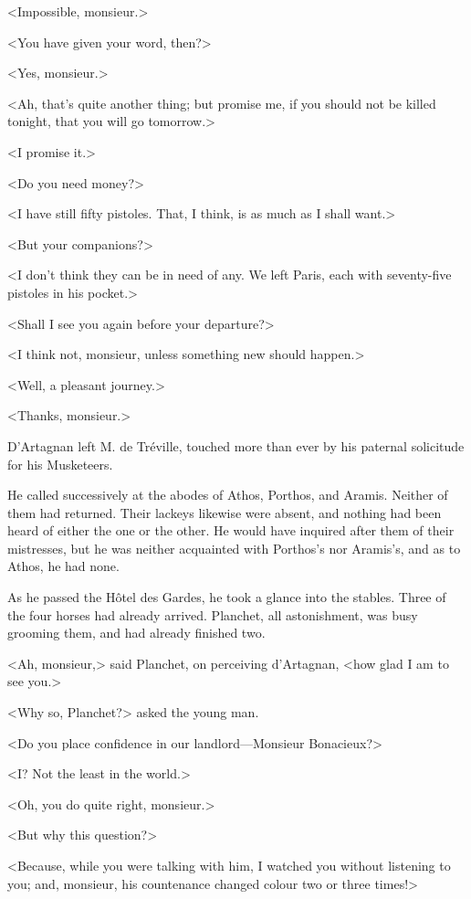 <Impossible, monsieur.> 

<You have given your word, then?> 

<Yes, monsieur.> 

<Ah, that's quite another thing; but promise me, if you should not be killed tonight, that you will go tomorrow.> 

<I promise it.> 

<Do you need money?> 

<I have still fifty pistoles. That, I think, is as much as I shall want.> 

<But your companions?> 

<I don't think they can be in need of any. We left Paris, each with seventy-five pistoles in his pocket.> 

<Shall I see you again before your departure?> 

<I think not, monsieur, unless something new should happen.> 

<Well, a pleasant journey.> 

<Thanks, monsieur.> 

D'Artagnan left M. de Tréville, touched more than ever by his paternal solicitude for his Musketeers. 

He called successively at the abodes of Athos, Porthos, and Aramis. Neither of them had returned. Their lackeys likewise were absent, and nothing had been heard of either the one or the other. He would have inquired after them of their mistresses, but he was neither acquainted with Porthos's nor Aramis's, and as to Athos, he had none. 

As he passed the Hôtel des Gardes, he took a glance into the stables. Three of the four horses had already arrived. Planchet, all astonishment, was busy grooming them, and had already finished two. 

<Ah, monsieur,> said Planchet, on perceiving d'Artagnan, <how glad I am to see you.> 

<Why so, Planchet?> asked the young man. 

<Do you place confidence in our landlord---Monsieur Bonacieux?> 

<I? Not the least in the world.> 

<Oh, you do quite right, monsieur.> 

<But why this question?> 

<Because, while you were talking with him, I watched you without listening to you; and, monsieur, his countenance changed colour two or three times!> 

